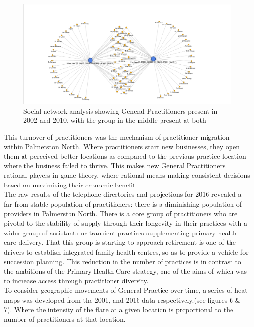 \documentclass[11pt,a4paper]{article}
\begin{document}
\begin{figure}[htp]
\centering
\includegraphics[scale=0.4]{fig3.png}
\caption{Social network analysis showing General Practitioners present in 2002 and 2010, with the group in the middle present at both}
\label{General Practitioners present in 2002 and 2010}
\end{figure}

This turnover of practitioners was the mechanism of practitioner migration within Palmerston North. Where practitioners start new businesses, they open them at perceived better locations as compared to the previous practice location where the business failed to thrive. This makes new General Practitioners rational players in game theory, where rational means making consistent decisions based on maximising their economic benefit. \\

The raw results of the telephone directories and projections for 2016 revealed a far from stable population of practitioners: there is a diminishing population of providers in Palmerston North. There is a core group of practitioners who are pivotal to the stability of supply through their longevity in their practices with a wider group of assistants or transient practices supplementing primary health care delivery. That this group is starting to approach retirement is one of the drivers to establish integrated family health centres, so as to provide a vehicle for succession planning. This reduction in the number of practices is in contrast to the ambitions of the Primary Health Care strategy, one of the aims of which was to increase access through practitioner diversity.  \\

To consider geographic movements of General Practice over time, a series of heat maps was developed from the 2001, and 2016 data respectively.(see figures 6 \& 7). Where the intensity of the flare at a given location is proportional to the number of practitioners at that location.\\ 
\end{document}
